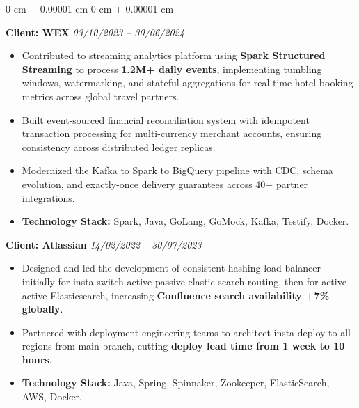 \documentclass[10pt, letterpaper]{article}
\newenvironment{onecolentry}{
    \begin{adjustwidth}{
        0 cm + 0.00001 cm
    }{
        0 cm + 0.00001 cm
    }
}{
    \end{adjustwidth}
} %
\begin{document}
\begin{onecolentry}
            \vspace{0.10 cm}
            \hspace{0.5cm}\textbf{Client: WEX} \hfill \textit{03/10/2023 -- 30/06/2024}
            \begin{itemize}[
                topsep=0.10 cm,
                parsep=0.10 cm,
                partopsep=0pt,
                itemsep=0pt,
                leftmargin=0 cm + 10pt + 0.5cm
            ]
            \item Contributed to streaming analytics platform using \textbf{Spark Structured Streaming} to process \textbf{1.2M+ daily events}, implementing tumbling windows, watermarking, and stateful aggregations for real-time hotel booking metrics across global travel partners.
            \item Built event-sourced financial reconciliation system with idempotent transaction processing for multi-currency merchant accounts, ensuring consistency across distributed ledger replicas.
            \item Modernized the Kafka to Spark to BigQuery pipeline with CDC, schema evolution, and exactly-once delivery guarantees across 40+ partner integrations.
            \item \textbf{Technology Stack:} Spark, Java, GoLang, GoMock, Kafka, Testify, Docker.
            \end{itemize}

            \vspace{0.10 cm}
            \hspace{0.5cm}\textbf{Client: Atlassian} \hfill \textit{14/02/2022 -- 30/07/2023}
            \begin{itemize}[
                topsep=0.10 cm,
                parsep=0.10 cm,
                partopsep=0pt,
                itemsep=0pt,
                leftmargin=0 cm + 10pt + 0.5cm
            ]
                \item Designed and led the development of consistent-hashing load balancer initially for insta-switch active-passive elastic search routing, then for active-active Elasticsearch, increasing \textbf{Confluence search availability +7\% globally}.
                \item Partnered with deployment engineering teams to architect insta-deploy to all regions from main branch, cutting \textbf{deploy lead time from 1 week to 10 hours}.
                \item \textbf{Technology Stack:} Java, Spring, Spinnaker, Zookeeper, ElasticSearch, AWS, Docker.
            \end{itemize}
        \end{onecolentry}
\end{document}
